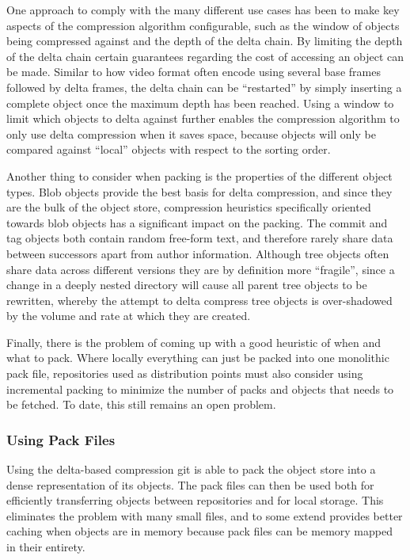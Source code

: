 
One approach to comply with the many different use cases has been to
make key aspects of the compression algorithm configurable, such as
the window of objects being compressed against and the depth of the
delta chain. By limiting the depth of the delta chain certain
guarantees regarding the cost of accessing an object can be made.
Similar to how video format often encode using several base frames
followed by delta frames, the delta chain can be ``restarted'' by
simply inserting a complete object once the maximum depth has been
reached. Using a window to limit which objects to delta against
further enables the compression algorithm to only use delta
compression when it saves space, because objects will only be compared
against ``local'' objects with respect to the sorting order.

Another thing to consider when packing is the properties of the
different object types. Blob objects provide the best basis for delta
compression, and since they are the bulk of the object store,
compression heuristics specifically oriented towards blob objects has
a significant impact on the packing. The commit and tag objects both
contain random free-form text, and therefore rarely share data between
successors apart from author information. Although tree objects often
share data across different versions they are by definition more
``fragile'', since a change in a deeply nested directory will cause
all parent tree objects to be rewritten, whereby the attempt to delta
compress tree objects is over-shadowed by the volume and rate at which
they are created.

Finally, there is the problem of coming up with a good heuristic of
when and what to pack. Where locally everything can just be packed
into one monolithic pack file, repositories used as distribution
points must also consider using incremental packing to minimize the
number of packs and objects that needs to be fetched. To date, this
still remains an open problem.

\subsubsection{Using Pack Files}

Using the delta-based compression git is able to pack the object store
into a dense representation of its objects. The pack files can then be
used both for efficiently transferring objects between repositories and
for local storage. This eliminates the problem with many small files,
and to some extend provides better caching when objects are in memory
because pack files can be memory mapped in their entirety.

